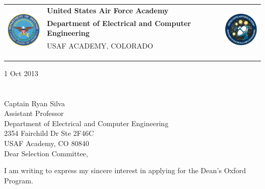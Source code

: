 \documentclass{article}
\begin{document}
	\noindent \begin{tabu} to \textwidth{l X[c] r}
	 & 
	\textbf{United States Air Force Academy} &  
	\\
	& \textbf{Department of Electrical and Computer Engineering} & \\
	& \tiny{USAF ACADEMY, COLORADO}\\
	\\ \\ \\
	\end{tabu}

	\hfill1 Oct 2013
	\hspace{0pt} \\
	\hspace{0pt} \\
	\hspace{0pt} \\
\noindent Captain Ryan Silva \\
Assistant Professor \\
Department of Electrical and Computer Engineering \\
2354 Fairchild Dr Ste 2F46C \\
USAF Academy, CO 80840 \\

\noindent Dear Selection Committee,

I am writing to express my sincere interest in applying for the Dean's Oxford Program.  \\
\end{document}
